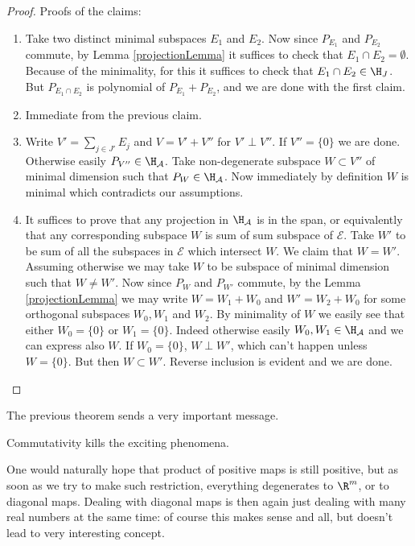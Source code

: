 \begin{proof}
	Proofs of the claims:
	\begin{enumerate}
		\item Take two distinct minimal subspaces $E_{1}$ and $E_{2}$. Now since $P_{E_{1}}$ and $P_{E_{2}}$ commute, by Lemma \ref{projectionLemma} it suffices to check that $E_{1} \cap E_{2} = \emptyset$. Because of the minimality, for this it suffices to check that $E_{1} \cap E_{2} \in \H_{J}$. But $P_{E_{1} \cap E_{2}}$ is polynomial of $P_{E_{1}} + P_{E_{2}}$, and we are done with the first claim.
		\item Immediate from the previous claim.
		\item Write $V' = \sum_{j \in J'} E_{j}$ and $V = V' + V''$ for $V' \perp V''$. If $V'' = \{0\}$ we are done. Otherwise easily $P_{V''} \in \H_{\mathcal{A}}$. Take non-degenerate subspace $W \subset V''$ of minimal dimension such that $P_{W} \in \H_{\mathcal{A}}$. Now immediately by definition $W$ is minimal which contradicts our assumptions.
		\item It suffices to prove that any projection in $\H_{\mathcal{A}}$ is in the span, or equivalently that any corresponding subspace $W$ is sum of sum subspace of $\mathcal{E}$. Take $W'$ to be sum of all the subspaces in $\mathcal{E}$ which intersect $W$. We claim that $W = W'$. Assuming otherwise we may take $W$ to be subspace of minimal dimension such that $W \neq W'$. Now since $P_{W}$ and $P_{W'}$ commute, by the Lemma \ref{projectionLemma} we may write $W = W_{1} + W_{0}$ and $W' = W_{2} + W_{0}$ for some orthogonal subspaces $W_{0}, W_{1}$ and $W_{2}$. By minimality of $W$ we easily see that either $W_{0} = \{0\}$ or $W_{1} = \{0\}$. Indeed otherwise easily $W_{0}, W_{1} \in \H_{\mathcal{A}}$ and we can express also $W$. If $W_{0} = \{0\}$, $W \perp W'$, which can't happen unless $W = \{0\}$. But then $W \subset W'$. Reverse inclusion is evident and we are done.
	\end{enumerate}
\end{proof}

The previous theorem sends a very important message.

\begin{phil}
	Commutativity kills the exciting phenomena.
\end{phil}

One would naturally hope that product of positive maps is still positive, but as soon as we try to make such restriction, everything degenerates to $\R^{m}$, or to diagonal maps. Dealing with diagonal maps is then again just dealing with many real numbers at the same time: of course this makes sense and all, but doesn't lead to very interesting concept.

